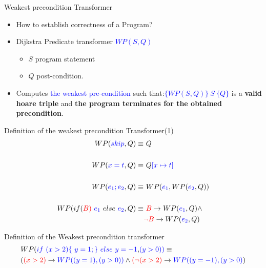 \begin{frame}{Weakest precondition Transformer}
	\begin{itemize}
		\item How to establish correctness of a Program?
		\item Dijkstra Predicate transformer \textcolor{blue}{$WP(S,Q)$}
		\begin{itemize}
			\item $S$ program statement
			\item $Q$ post-condition.
		\end{itemize}
	\item Computes \textcolor{blue}{the weakest pre-condition}
	such that:\textcolor{blue}{$\{WP(S,Q)\} ~ S ~\{Q\}$} is a \textbf{valid hoare triple} and \textbf{the program terminates for the obtained precondition}.
	\end{itemize}
\end{frame}

\begin{frame}{Definition of the weakest precondition Transformer(1)}		
		\begin{equation} \label{eq1}
		\begin{split}
		WP(\color{blue}skip \color{black}, Q) \equiv &~ Q \\ \\
		WP(\color{blue}x=t \color{black}, Q) \equiv & ~Q \color{blue}[x\mapsto t] \color{black}\\ \\
		WP(\color{blue}e_1;e_2 \color{black}, Q) \equiv & ~WP(\color{blue}e_1\color{black},WP(\color{blue}e_2\color{black},Q))\\ \\ 
		WP(if(\color{red}B) ~ \color{blue}e_1 ~\color{black}else ~\color{blue}e_2\color{black}, Q)  \equiv  &~ \color{red} B \color{black}\rightarrow WP(\color{blue}e_1\color{black},Q) \wedge\\
		& \color{red} \neg B \color{black} \rightarrow WP(\color{blue}e_2 \color{black},Q)
		\end{split}
		\end{equation}
\end{frame}
\begin{frame}{Definition of the Weakest precondition transformer}		
\footnotesize{
	\begin{equation} \label{eq1}
	\begin{split}
	&WP(\color{blue}if ~ (x>2)\{ ~ y=1;\} ~else ~y= -1 \textcolor{black}, (y > 0))\color{black} \equiv\\ & (\color{red}(x>2) \color{black} \rightarrow \color{blue}WP((y=1), (y>0)) \color{black}\wedge \color{red}(\neg(x>2) \color{black} \rightarrow \color{blue} WP((y=-1), (y>0)\color{black})
	\end{split}
	\end{equation}}

\end{frame}

